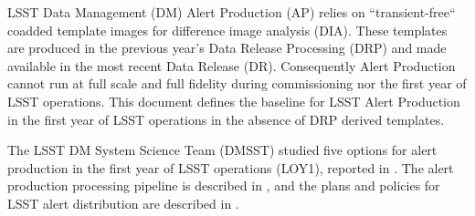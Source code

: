 LSST \gls{Data Management} (\gls{DM}) \gls{Alert Production} (\gls{AP}) relies on ``transient-free`` coadded template images for difference image analysis (\gls{DIA}). These templates are  produced in the previous year's \gls{Data Release Processing} (\gls{DRP}) and made available in the most recent Data Release (DR). Consequently \gls{Alert Production} cannot run at full scale and full fidelity during commissioning nor the first year of \gls{LSST} operations. This document defines the baseline for \gls{LSST} \gls{Alert Production} in the first year of \gls{LSST} operations in the absence of \gls{DRP} derived templates. 

 The LSST \gls{DM} System Science Team (\gls{DMSST}) studied five options for alert production in the first year of \gls{LSST} operations (\gls{LOY1}), reported in  . The alert production processing \gls{pipeline} is described in  , and the plans and policies for \gls{LSST} alert distribution  are described in . 

